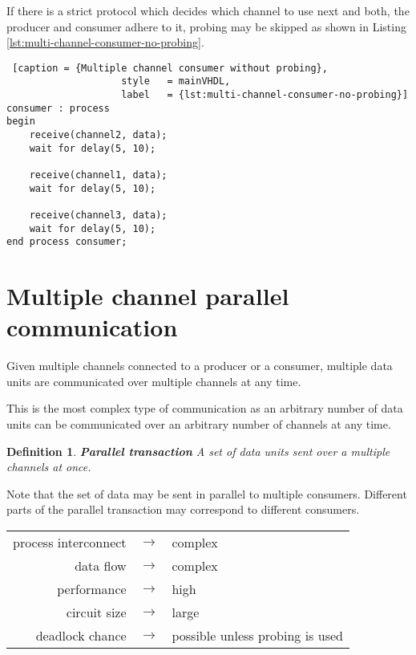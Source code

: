\documentclass{report}
\newtheorem{definition}{Definition}[section]
\begin{document}
If there is a strict protocol which decides which channel to use next and both,
the producer and consumer adhere to it, probing may be skipped as shown in
Listing \ref{lst:multi-channel-consumer-no-probing}.

\begin{lstlisting} [caption = {Multiple channel consumer without probing},
                    style   = mainVHDL,
                    label   = {lst:multi-channel-consumer-no-probing}]
consumer : process
begin
    receive(channel2, data);
    wait for delay(5, 10);

    receive(channel1, data);
    wait for delay(5, 10);

    receive(channel3, data);
    wait for delay(5, 10);
end process consumer;

\end{lstlisting}


\section{Multiple channel parallel communication}

Given multiple channels connected to a producer or a consumer, multiple data
units are communicated over multiple channels at any time.

This is the most complex type of communication as an arbitrary number of data
units can be communicated over an arbitrary number of channels at any time.

\begin{definition}{\textbf{Parallel transaction}}
    A set of data units sent over a multiple channels at once.
\end{definition}

Note that the set of data may be sent in parallel to multiple consumers.
Different parts of the parallel transaction may correspond to different
consumers.

\begin{table}[H]
    \centering
    \begin{tabular}{ r c l }
        process interconnect & $\rightarrow$ & complex \\
        data flow            & $\rightarrow$ & complex \\
        performance          & $\rightarrow$ & high \\
        circuit size         & $\rightarrow$ & large \\
        deadlock chance      & $\rightarrow$ & possible unless probing is used \\
    \end{tabular}
\end{table}
\end{document}
